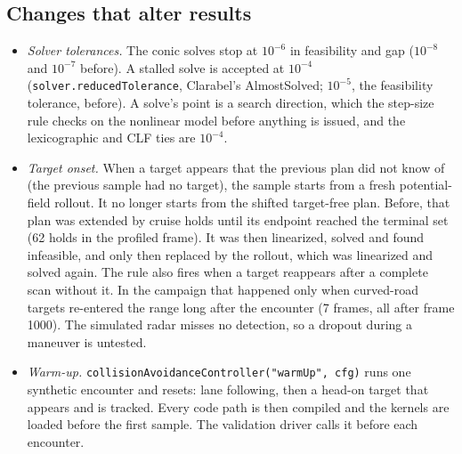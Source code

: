 \documentclass[11pt]{article}
\begin{document}
\subsection{Changes that alter results}
\begin{itemize}
\item \emph{Solver tolerances.} The conic solves stop at $10^{-6}$ in
  feasibility and gap ($10^{-8}$ and $10^{-7}$ before). A stalled solve
  is accepted at $10^{-4}$ (\texttt{solver.reducedTolerance}, Clarabel's
  AlmostSolved; $10^{-5}$, the feasibility tolerance, before). A solve's
  point is a search direction, which the step-size rule checks on the
  nonlinear model before anything is issued, and the lexicographic and CLF
  ties are $10^{-4}$.
\item \emph{Target onset.} When a target appears that the previous plan did
  not know of (the previous sample had no target), the sample starts from a
  fresh potential-field rollout. It no longer starts from the shifted
  target-free plan. Before, that plan was extended by cruise holds until its
  endpoint reached the terminal set (62 holds in the profiled frame). It was
  then linearized, solved and found infeasible, and only then replaced by
  the rollout, which was linearized and solved again. The rule also fires
  when a target reappears after a complete scan without it. In the campaign
  that happened only when curved-road targets re-entered the range long
  after the encounter (7 frames, all after frame 1000). The simulated
  radar misses no detection, so a dropout during a maneuver is untested.
\item \emph{Warm-up.} \texttt{collisionAvoidanceController("warmUp", cfg)}
  runs one synthetic encounter and resets: lane following, then a head-on
  target that appears and is tracked. Every code path is then compiled and
  the kernels are loaded before the first sample. The validation driver
  calls it before each encounter.
\end{itemize}
\end{document}
